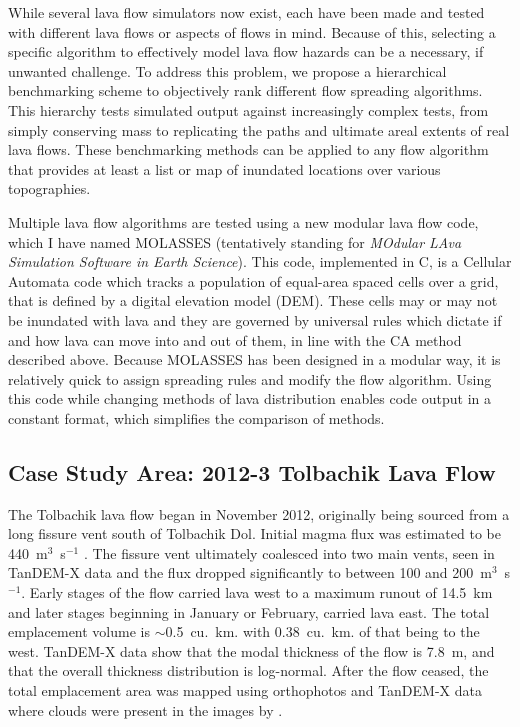 \documentclass[12pt,letter]{article}
\begin{document}
	While several lava flow simulators now exist, each have been made and tested with different lava flows or aspects of flows in mind. Because of this, selecting a specific algorithm to effectively model lava flow hazards can be a necessary, if unwanted challenge. To address this problem, we propose a hierarchical benchmarking scheme to objectively rank different flow spreading algorithms. This hierarchy tests simulated output against increasingly complex tests, from simply conserving mass to replicating the paths and ultimate areal extents of real lava flows. These benchmarking methods can be applied to any flow algorithm that provides at least a list or map of inundated locations over various topographies.

	Multiple lava flow algorithms are tested using a new modular lava flow code, which I have named MOLASSES (tentatively standing for \textit{MOdular LAva Simulation Software in Earth Science}). This code, implemented in C, is a Cellular Automata code which tracks a population of equal-area spaced cells over a grid, that is defined by a digital elevation model (DEM). These cells may or may not be inundated with lava and they are governed by universal rules which dictate if and how lava can move into and out of them, in line with the CA method described above. Because MOLASSES has been designed in a modular way, it is relatively quick to assign spreading rules and modify the flow algorithm. Using this code while changing methods of lava distribution enables code output in a constant format, which simplifies the comparison of methods.
	
	\subsection{Case Study Area: 2012-3 Tolbachik Lava Flow}
The Tolbachik lava flow began in November 2012, originally being sourced from a long fissure vent south of Tolbachik Dol. Initial magma flux was estimated to be 440~m$^3$~s$^{-1}$ \citep{belousov2015overview}. The fissure vent ultimately coalesced into two main vents, seen in TanDEM-X data and the flux dropped significantly to between 100 and 200~m$^3$~s$^{-1}$. Early stages of the flow carried lava west to a maximum runout of 14.5~km and later stages beginning in January or February, carried lava east. The total emplacement volume is $\sim$0.5~cu.~km. with 0.38~cu.~km. of that being to the west. TanDEM-X data show that the modal thickness of the flow is 7.8~m, and that the overall thickness distribution is log-normal. After the flow ceased, the total emplacement area was mapped using orthophotos and TanDEM-X data where clouds were present in the images by \citet{kubanek2015lava}.
	
\end{document}
